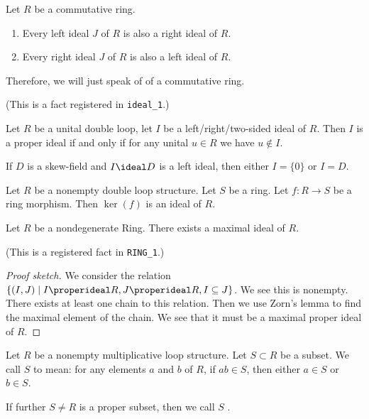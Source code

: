 \begin{theorem}
Let $R$ be a commutative ring.
\begin{enumerate}
\item Every left ideal $J$ of $R$ is also a right ideal of $R$.
\item Every right ideal $J$ of $R$ is also a left ideal of $R$.
\end{enumerate}
Therefore, we will just speak of  of a commutative ring.
\end{theorem}
(This is a fact registered in \texttt{ideal\_1}.)

\begin{proposition}
Let $R$ be a unital double loop, let $I$ be a left/right/two-sided ideal of $R$.
Then $I$ is a proper ideal if and only if for any unital $u\in R$ we
have $u\notin I$.
\end{proposition}

\begin{proposition}
If $D$ is a skew-field and $I\ideal D$ is a left ideal, then either
$I=\{0\}$ or $I=D$.
\end{proposition}

\begin{theorem}
Let $R$ be a nonempty double loop structure.
Let $S$ be a ring. Let $f\colon R\to S$ be a ring morphism.
Then $\ker(f)$ is an ideal of $R$.
\end{theorem}

\begin{theorem}
Let $R$ be a nondegenerate Ring.
There exists a maximal ideal of $R$.
\end{theorem}

(This is a registered fact in \texttt{RING\_1}.)

\begin{proof}[Proof sketch]
We consider the relation $\{(I,J)\mid I\properideal R, J\properideal R, I\subset J\}$.
We see this is nonempty.
There exists at least one chain to this relation.
Then we use Zorn's lemma to find the maximal element of the chain.
We see that it must be a maximal proper ideal of $R$.
\end{proof}

\begin{definition}
Let $R$ be a nonempty multiplicative loop structure.
Let $S\subset R$ be a subset.
We call $S$  to mean: for any elements $a$ and $b$
of $R$, if $ab\in S$, then either $a\in S$ or $b\in S$.

If further $S\neq R$ is a proper subset, then we call $S$ .
\end{definition}

